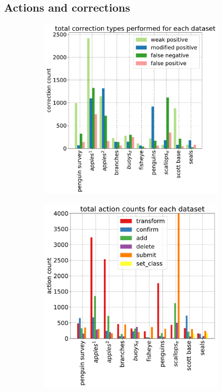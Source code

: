 \subsection {Actions and corrections}

\begin{figure}[ht]
\centering
\begin{subfigure}{0.45\linewidth}
\includegraphics[width=1.0\linewidth]{charts/summaries/correction_counts.pdf}
\caption{}
\end{subfigure}

\begin{subfigure}{0.45\linewidth}
\includegraphics[width=1.0\linewidth]{charts/summaries/action_counts.pdf}
\caption{}
\end{subfigure}


\end{figure}
